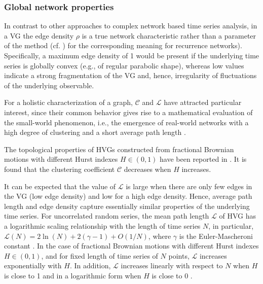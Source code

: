 				
		\subsubsection{Global network properties}
		In contrast to other approaches to complex network based time series analysis, in a VG the edge density $\rho$ is a true network characteristic rather than a parameter of the method (cf. \cite{Donner2010a,Donner2011}) for the corresponding meaning for recurrence networks). Specifically, a maximum edge density of 1 would be present if the underlying time series is globally convex (e.g., of regular parabolic shape), whereas low values indicate a strong fragmentation of the VG and, hence, irregularity of fluctuations of the underlying observable. 
		
		For a holistic characterization of a graph, $\mathcal{C}$ and $\mathcal{L}$ have attracted particular interest, since their common behavior gives rise to a mathematical evaluation of the small-world phenomenon, i.e., the emergence of real-world networks with a high degree of clustering and a short average path length \cite{Watts1998}.
		
		The topological properties of HVGs constructed from fractional Brownian motions with different Hurst indexes $H \in (0, 1)$ have been reported in \cite{Xie2011}. It is found that the clustering coefficient $\mathcal{C}$ decreases when $H$ increases. 
		
		It can be expected that the value of $\mathcal{L}$ is large when there are only few edges in the VG (low edge density) and low for a high edge density. Hence, average path length and edge density capture essentially similar properties of the underlying time series. For uncorrelated random series, the mean path length $\mathcal{L}$ of HVG has a logarithmic scaling relationship with the length of time series $N$, in particular, $\mathcal{L}(N) = 2 \ln (N) + 2 (\gamma - 1) + O(1/N)$, where $\gamma$ is the Euler-Mascheroni constant \cite{Luque2009}. In the case of fractional Brownian motions with different Hurst indexes $H \in (0, 1)$, and for fixed length of time series of $N$ points, $\mathcal{L}$ increases exponentially with $H$. In addition, $\mathcal{L}$ increases linearly with respect to $N$ when $H$ is close to 1 and in a logarithmic form when $H$ is close to 0 \cite{Xie2011}. 
	
